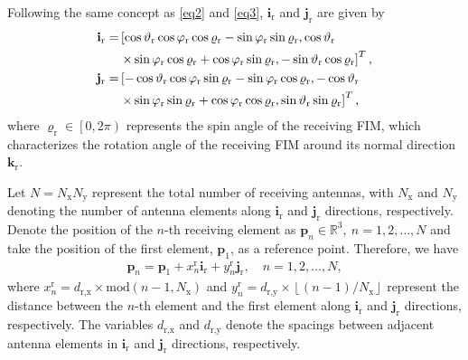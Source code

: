 \documentclass[lettersize,journal]{IEEEtran}
\begin{document}
Following the same concept as \eqref{eq2} and \eqref{eq3}, $\mathbf{i}_{\textrm{r}}$ and $\mathbf{j}_{\textrm{r}}$ are given by
\begin{align}
 \mathbf{i}_{\textrm{r}} =& \left [ \cos\vartheta_{\textrm{r}} \cos\varphi_{\textrm{r}} \cos\varrho_{\textrm{r}} -\sin\varphi_{\textrm{r}} \sin \varrho_{\textrm{r}}, \cos\vartheta_{\textrm{r}}\right. \notag\\
 & \left. \times \sin\varphi_{\textrm{r}} \cos\varrho_{\textrm{r}} +\cos\varphi_{\textrm{r}} \sin \varrho_{\textrm{r}}, -\sin\vartheta_{\textrm{r}} \cos\varrho_{\textrm{r}} \right ]^{T},\label{eq8}\\
 \mathbf{j}_{\textrm{r}} =& \left [ -\cos\vartheta_{\textrm{r}} \cos\varphi_{\textrm{r}} \sin\varrho_{\textrm{r}} -\sin\varphi_{\textrm{r}} \cos\varrho_{\textrm{r}},-\cos\vartheta_{\textrm{r}}\right. \notag\\
 & \left. \times \sin\varphi_{\textrm{r}} \sin\varrho_{\textrm{r}} +\cos\varphi_{\textrm{r}} \cos \varrho_{\textrm{r}}, \sin\vartheta_{\textrm{r}} \sin\varrho_{\textrm{r}} \right ]^{T},\label{eq9}
\end{align}
where $\varrho_{\textrm{r}}\in \left [ 0,2\pi \right )$ represents the spin angle of the receiving FIM, which characterizes the rotation angle of the receiving FIM around its normal direction $\mathbf{k}_{\textrm{r}}$.


Let $N=N_{\textrm{x}}N_{\textrm{y}}$ represent the total number of receiving antennas, with $N_{\textrm{x}}$ and $N_{\textrm{y}}$ denoting the number of antenna elements along $\mathbf{i}_{\textrm{r}}$ and $\mathbf{j}_{\textrm{r}}$ directions, respectively. Denote the position of the $n$-th receiving element as $\mathbf{p}_{n}\in \mathbb{R}^{3},\ n=1,2,\ldots ,N$ and take the position of the first element, $\mathbf{p}_{1}$, as a reference point. Therefore, we have
\begin{align}
 \mathbf{p}_{n} = \mathbf{p}_{1}+ x_{n}^{\textrm{r}}\mathbf{i}_{\textrm{r}}+y_{n}^{\textrm{r}}\mathbf{j}_{\textrm{r}},\quad n = 1, 2, \ldots, N,
\end{align}
where $x_{n}^{\textrm{r}} = d_{\textrm{r},\textrm{x}}\times \textrm{mod}\left ( n-1,N_{\textrm{x}} \right )$ and $y_{n}^{\textrm{r}} = d_{\textrm{r},\textrm{y}}\times \left \lfloor \left ( n-1 \right )/N_{\textrm{x}} \right \rfloor$ represent the distance between the $n$-th element and the first element along $\mathbf{i}_{\textrm{r}}$ and $\mathbf{j}_{\textrm{r}}$ directions, respectively. The variables $d_{\textrm{r},\textrm{x}}$ and $d_{\textrm{r},\textrm{y}}$ denote the spacings between adjacent antenna elements in $\mathbf{i}_{\textrm{r}}$ and $\mathbf{j}_{\textrm{r}}$ directions, respectively.
\end{document}
